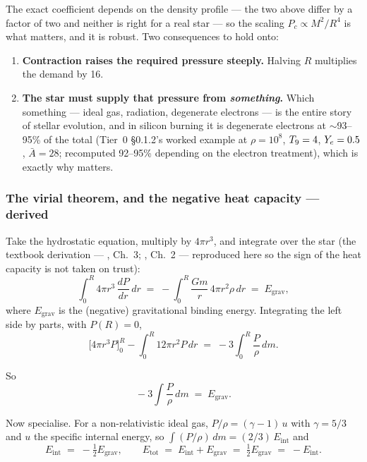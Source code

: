 The exact coefficient depends on the density profile --- the two above differ by
a factor of two and neither is right for a real star --- so the scaling
$P_c \propto M^2/R^4$ is what matters, and it is robust. Two consequences to
hold onto:

\begin{enumerate}
\item \textbf{Contraction raises the required pressure steeply.} Halving $R$
  multiplies the demand by 16.
\item \textbf{The star must supply that pressure from \emph{something}.} Which
  something --- ideal gas, radiation, degenerate electrons --- is the entire
  story of stellar evolution, and in silicon burning it is degenerate electrons
  at ${\sim}$93--95\% of the total (Tier~0 \S0.1.2's worked example at
  $\rho = 10^8$, $T_{9} = 4$, $Y_{e} = 0.5$, $\bar A = 28$; recomputed 92--95\%
  depending on the electron treatment), which is exactly why \Ye{} matters.
\end{enumerate}

\subsubsection{The virial theorem, and the negative heat capacity --- derived}
\label{sec:virial}

Take the hydrostatic equation, multiply by $4\pi r^3$, and integrate over the
star (the textbook derivation --- \citealt{kippenhahn2012}, Ch.~3;
\citealt{clayton1968}, Ch.~2 --- reproduced here so the sign of the heat
capacity is not taken on trust):
%
\begin{equation}
\int_0^R 4\pi r^{3}\,\frac{dP}{dr}\,dr
\;=\; -\int_0^R \frac{G m}{r}\,4\pi r^{2}\rho\,dr \;=\; E_{\mathrm{grav}},
\label{eq:virialstart}
\end{equation}
%
where $E_{\mathrm{grav}}$ is the (negative) gravitational binding energy.
Integrating the left side by parts, with $P(R) = 0$,
%
\begin{equation}
\Big[4\pi r^{3}P\Big]_0^R - \int_0^R 12\pi r^{2} P\,dr
\;=\; -3\int_0^R \frac{P}{\rho}\,dm .
\label{eq:virialparts}
\end{equation}

So
%
\begin{equation}
\boxed{\;-3\int \frac{P}{\rho}\,dm \;=\; E_{\mathrm{grav}}.\;}
\label{eq:virial}
\end{equation}

Now specialise. For a non-relativistic ideal gas, $P/\rho = (\gamma-1)\,u$ with
$\gamma = 5/3$ and $u$ the specific internal energy, so
$\int (P/\rho)\,dm = (2/3)\,E_{\mathrm{int}}$ and
%
\begin{equation}
E_{\mathrm{int}} \;=\; -\tfrac{1}{2}E_{\mathrm{grav}},
\qquad
E_{\mathrm{tot}} \;=\; E_{\mathrm{int}} + E_{\mathrm{grav}}
\;=\; \tfrac12 E_{\mathrm{grav}} \;=\; -E_{\mathrm{int}} .
\label{eq:virialideal}
\end{equation}

